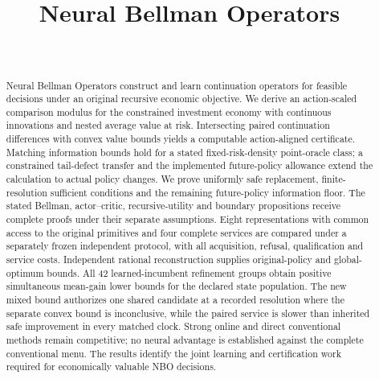 \documentclass[ecta,nameyear,draft]{econsocart}
\begin{document}
\begin{frontmatter}
\title{Neural Bellman Operators}
\begin{aug}
\author[id=au1,addressref={add1}]{~}
\address[id=add1]{Peking University}
\end{aug}
\begin{abstract}
Neural Bellman Operators construct and learn continuation operators for feasible
decisions under an original recursive economic objective. We derive an
action-scaled comparison modulus for the constrained investment economy with
continuous innovations and nested average value at risk. Intersecting paired
continuation differences with convex value bounds yields a computable
action-aligned certificate. Matching information bounds hold for a stated
fixed-risk-density point-oracle class; a constrained tail-defect transfer and
the implemented future-policy allowance extend the calculation to actual policy
changes. We prove uniformly safe replacement, finite-resolution sufficient
conditions and the remaining future-policy information floor. The stated Bellman,
actor--critic, recursive-utility and boundary propositions receive complete
proofs under their separate assumptions. Eight representations with common
access to the original primitives and four complete services are compared
under a separately frozen independent protocol, with all acquisition,
refusal, qualification and service costs. Independent rational reconstruction
supplies original-policy and global-optimum bounds. All 42 learned-incumbent
refinement groups obtain positive simultaneous mean-gain lower bounds for
the declared state population. The new mixed bound authorizes one shared
candidate at a recorded resolution where the separate convex bound is
inconclusive, while
the paired service is slower than inherited safe improvement in every matched
clock. Strong online and direct conventional methods remain competitive;
no neural advantage is established against the complete conventional
menu. The results identify the joint learning and certification work required
for economically valuable NBO decisions.
\end{abstract}
\begin{keyword}
\end{keyword}
\end{frontmatter}












\end{document}
